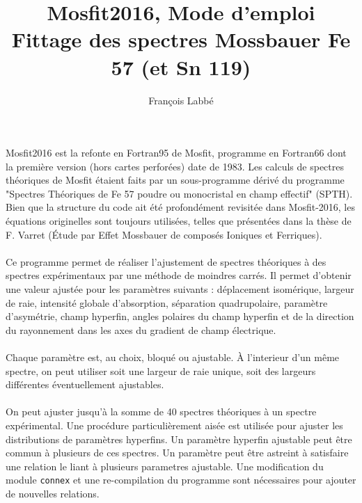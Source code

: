 \documentclass[a4paper]{article}
\begin{document}
\title{Mosfit2016, Mode d'emploi \\Fittage des spectres Mossbauer Fe 57 (et Sn 119)}
\author{Fran\c{c}ois Labb\'e}
\maketitle

\paragraph{}
Mosfit2016 est la refonte en Fortran95 de Mosfit, programme en Fortran66 dont la première version (hors cartes perforées) date de 1983.
Les calculs de spectres théoriques de Mosfit étaient faits par un sous-programme dérivé du programme "Spectres Théoriques de Fe 57 poudre ou monocristal en champ effectif" (SPTH). 
Bien que la structure du code ait été profondément revisitée dans Mosfit-2016, les équations originelles sont toujours utilisées, telles que présentées dans la thèse de F. Varret (\'Etude par Effet Mossbauer de composés Ioniques et Ferriques).


\paragraph{}
Ce programme permet de réaliser l'ajustement de spectres théoriques à des spectres expérimentaux par une méthode de moindres carrés.
Il permet d'obtenir une valeur ajustée pour les paramètres suivants : déplacement isomérique, largeur de raie, intensité globale d'absorption, 
séparation quadrupolaire, paramètre d'asymétrie, champ hyperfin, angles polaires du champ hyperfin et de la direction du rayonnement dans les axes du gradient de champ électrique.

\paragraph{}
Chaque paramètre est, au choix, bloqué ou ajustable.
 À l'interieur d'un même spectre, on peut utiliser soit une largeur de raie unique, soit des largeurs différentes éventuellement ajustables. 

\paragraph{}
On peut ajuster jusqu'à la somme de 40 spectres théoriques à un spectre expérimental.
 Une procédure particulièrement aisée est utilisée pour ajuster les distributions de paramètres hyperfins.
 Un paramètre hyperfin ajustable peut être commun à plusieurs de ces spectres.
 Un paramètre peut être astreint à satisfaire une relation le liant à plusieurs parametres ajustable.
 Une modification du module \lstinline{connex} et une re-compilation du programme sont nécessaires pour ajouter de nouvelles relations.
 
\end{document}

